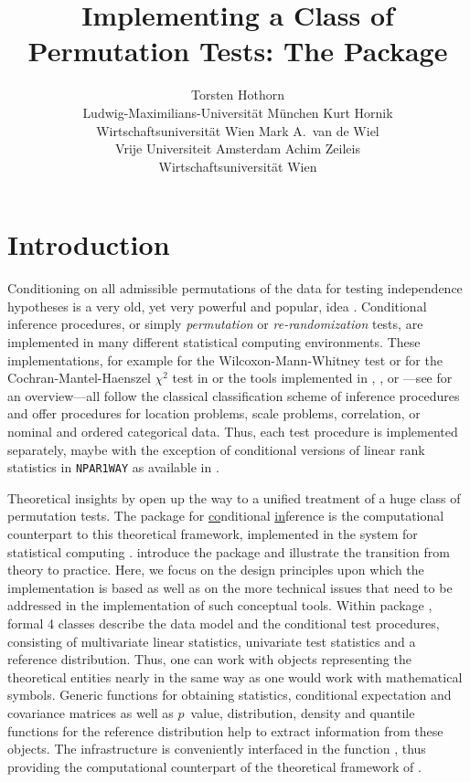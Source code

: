 \documentclass[article]{jss}
\author{Torsten Hothorn\\Ludwig-Maximilians-Universit\"at M\"unchen
   \And Kurt Hornik\\Wirtschaftsuniversit\"at Wien
   \AND Mark A.\ van de Wiel\\Vrije Universiteit Amsterdam
   \And Achim Zeileis\\Wirtschaftsuniversit\"at Wien}
\title{Implementing a Class of Permutation Tests: The \pkg{coin} Package}
\begin{document}
\section{Introduction}

Conditioning on all admissible permutations of the data for testing 
independence hypotheses is a very old, yet very powerful and popular, 
idea \citep{fisher1935,Ernst2004}. Conditional
inference procedures, or simply \textit{permutation} or \textit{re-randomization}
tests, are implemented in 
many different statistical computing environments.
These implementations, for example 
 for the Wilcoxon-Mann-Whitney test or
 for the Cochran-Mantel-Haenszel $\chi^2$ test in  \citep{rcore2007} 
or the tools implemented in  \citep{StatXact6}, 
 \citep{LogXact8}, or  \citep{Stata}---see \cite{Oster2002,Oster2003} 
for an overview---all follow the classical classification scheme of inference procedures and
offer procedures for location problems, scale problems, correlation, 
or nominal and ordered categorical data. 
Thus, each test procedure is 
implemented separately, maybe with the exception of conditional 
versions of linear rank statistics \citep{theory-of-:-1999} in \texttt{NPAR1WAY}
as available in  \citep{SAS}.

Theoretical insights by \cite{StrasserWeber1999} open up the way
to a unified treatment of a huge class of permutation
tests. The  package for \underline{co}nditional \underline{in}ference
is the computational counterpart to this theoretical framework,
implemented in the  system for statistical computing \citep{rcore2007}.
\cite{Hothorn:2006:AmStat} introduce the package and illustrate the
transition from theory to practice. Here, we focus on the design principles upon which the
 implementation is based as well as on the more technical issues
that need to be addressed in the implementation of such conceptual
tools.
Within package , formal 4 classes describe the data model 
and the conditional test procedures, 
consisting of multivariate linear statistics, univariate test statistics 
and a reference distribution. Thus, one can work with objects representing 
the theoretical entities nearly in the same way as one would work
with mathematical symbols. Generic functions for obtaining
statistics, conditional expectation and covariance matrices as well as 
$p$~value, distribution, density and quantile functions for the reference
distribution help to extract information from these objects.
The infrastructure is conveniently interfaced in the function ,
thus providing the computational counterpart of the theoretical framework of
\cite{StrasserWeber1999}.
\end{document}
